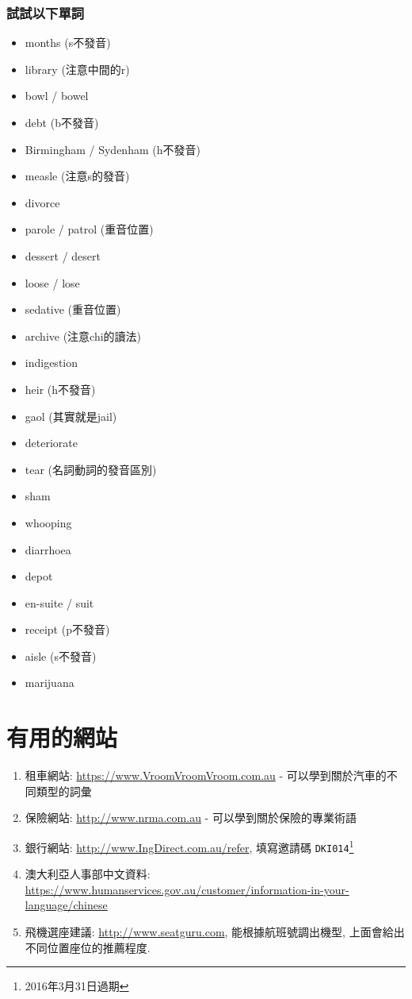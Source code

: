 \subsubsection{試試以下單詞}
\begin{multicols}{3}
\begin{itemize}
  \itemsep0em
  \item months (s不發音)
  \item library (注意中間的r)
  \item bowl / bowel
  \item debt (b不發音)
  \item Birmingham / Sydenham (h不發音)
  \item measle (注意s的發音)
  \item divorce
  \item parole / patrol (重音位置)
  \item dessert / desert
  \item loose / lose
  \item sedative (重音位置)
  \item archive (注意chi的讀法)
  \item indigestion
  \item heir (h不發音)
  \item gaol (其實就是jail)
  \item deteriorate
  \item tear (名詞動詞的發音區別)
  \item sham
  \item whooping
  \item diarrhoea
  \item depot
  \item en-suite / suit
  \item receipt (p不發音)
  \item aisle (s不發音)
  \item marijuana
\end{itemize}
\end{multicols}
\newpage

\section{有用的網站}
\begin{enumerate}
  \itemsep0em
  \item 租車網站: \url{https://www.VroomVroomVroom.com.au} - 可以學到關於汽車的不同類型的詞彙
  \item 保險網站: \url{http://www.nrma.com.au} - 可以學到關於保險的專業術語
  \item 銀行網站: \url{http://www.IngDirect.com.au/refer}, 填寫邀請碼 \texttt{DKI014}\footnote{2016年3月31日過期}
  \item 澳大利亞人事部中文資料: \url{https://www.humanservices.gov.au/customer/information-in-your-language/chinese}
  \item 飛機選座建議: \url{http://www.seatguru.com}, 能根據航班號調出機型, 上面會給出不同位置座位的推薦程度.
\end{enumerate}

